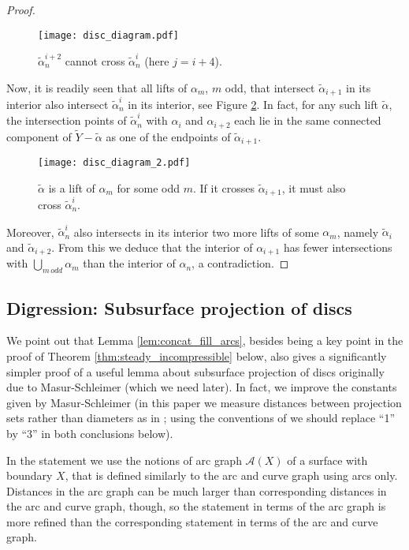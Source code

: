 \documentclass[11pt, oneside]{amsart}
\theoremstyle{definition}
\theoremstyle{definition}
\begin{document}
\begin{proof}
 \begin{figure}[h]
  \texttt{[image: disc\_diagram.pdf]}
  \caption{$\tilde\alpha^{i+2}_n$ cannot cross $\tilde\alpha^{i}_n$ (here $j=i+4$).}\label{fig:disc_diagram}
 \end{figure}

 Now, it is readily seen that all lifts of $\alpha_m$, $m$ odd, that intersect $\tilde\alpha_{i+1}$ in its interior also intersect $\tilde\alpha^i_n$ in its interior, see Figure \ref{fig:disc_diagram_2}. In fact, for any such lift $\tilde\alpha$, the intersection points of $\tilde\alpha^i_n$ with $\alpha_i$ and $\alpha_{i+2}$ each lie in the same connected component of $\tilde Y-\tilde\alpha$ as one of the endpoints of $\tilde\alpha_{i+1}$. 
 
  \begin{figure}[h]
  \texttt{[image: disc\_diagram\_2.pdf]}
  \caption{$\tilde\alpha$ is a lift of $\alpha_m$ for some odd $m$. If it crosses $\tilde\alpha_{i+1}$, it must also cross $\tilde\alpha^i_n$.}\label{fig:disc_diagram_2}
 \end{figure}
 
 
 Moreover, $\tilde\alpha^i_n$ also intersects in its interior two more lifts of some $\alpha_m$, namely $\tilde\alpha_i$ and $\tilde\alpha_{i+2}$. From this we deduce that the interior of $\alpha_{i+1}$ has fewer intersections with $\bigcup_{m\, odd} \alpha_m$ than the interior of $\alpha_n$, a contradiction.
\end{proof}

\subsection{Digression: Subsurface projection of discs}

We point out that Lemma \ref{lem:concat_fill_arcs}, besides being a key point in the proof of Theorem \ref{thm:steady_incompressible} below, also gives a significantly simpler proof of a useful lemma about subsurface projection of discs originally due to Masur-Schleimer \cite{MasurSchleimer} (which we need later). In fact, we improve the constants given by Masur-Schleimer (in this paper we measure distances between projection sets rather than diameters as in \cite{MasurSchleimer}; using the conventions of \cite{MasurSchleimer} we should replace ``1'' by ``3'' in both conclusions below).

In the statement we use the notions of arc graph $\mathcal A(X)$ of a surface with boundary $X$, that is defined similarly to the arc and curve graph using arcs only. Distances in the arc graph can be much larger than corresponding distances in the arc and curve graph, though, so the statement in terms of the arc graph is more refined than the corresponding statement in terms of the arc and curve graph.
\end{document}
